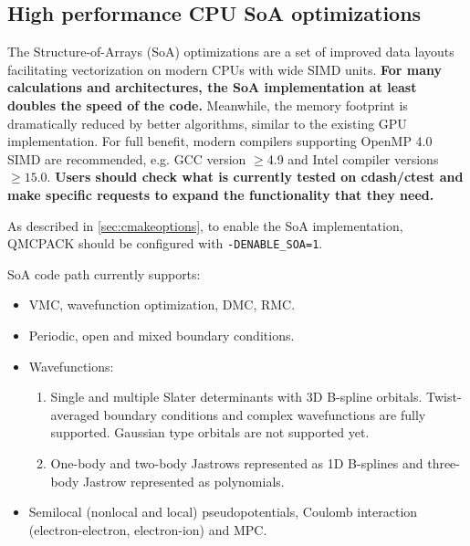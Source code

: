 \subsection{High performance CPU SoA optimizations}
The Structure-of-Arrays (SoA) optimizations \cite{IPCC_SC17} are a set
of improved data layouts facilitating vectorization on modern CPUs
with wide SIMD units. \textbf{For many calculations and architectures, the SoA
  implementation at least doubles the speed of the code.}  Meanwhile,
the memory footprint is dramatically reduced by better algorithms,
similar to the existing GPU implementation. For full benefit, modern
compilers supporting OpenMP 4.0 SIMD are recommended, e.g. GCC version
$\ge$4.9 and Intel compiler versions $\ge 15.0$. \textbf{Users should
  check what is currently tested on cdash/ctest and make specific
  requests to expand the functionality that they need.}

As described in \ref{sec:cmakeoptions}, to enable the SoA
implementation, QMCPACK should be configured with \texttt{-DENABLE\_SOA=1}.

SoA code path currently supports:
\begin{itemize}
  \item VMC, wavefunction optimization, DMC, RMC.
  \item Periodic, open and mixed boundary conditions.
  \item Wavefunctions:
    \begin{enumerate}
      \item Single and multiple Slater determinants with 3D B-spline
        orbitals. Twist-averaged boundary conditions and complex
        wavefunctions are fully supported. Gaussian type orbitals are
        not supported yet.
      \item One-body and two-body Jastrows represented as 1D B-splines and three-body Jastrow represented as polynomials.
    \end{enumerate}
  \item Semilocal (nonlocal and local) pseudopotentials, Coulomb interaction (electron-electron, electron-ion) and MPC.
\end{itemize}


